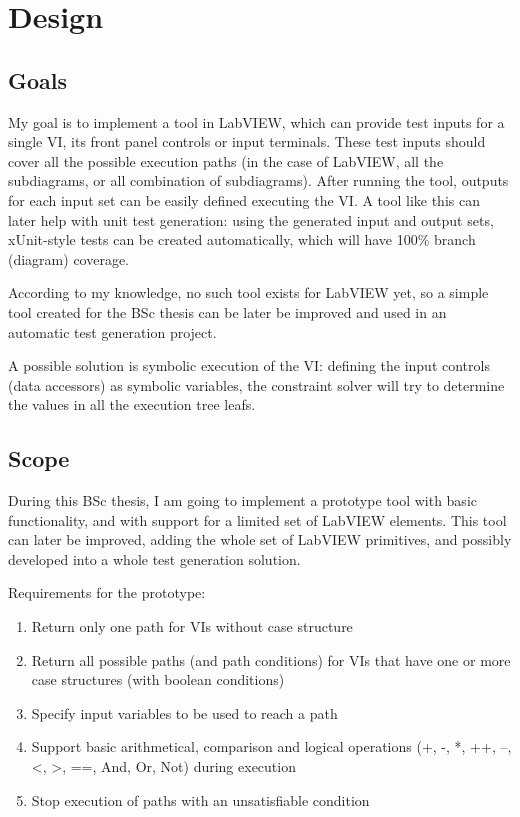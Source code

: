 \chapter{Design}
\section{Goals}
My goal is to implement a tool in LabVIEW, which can provide test inputs for a single VI, its front panel controls or input terminals. These test inputs should cover all the possible execution paths (in the case of LabVIEW, all the subdiagrams, or all combination of subdiagrams). After running the tool, outputs for each input set can be easily defined executing the VI. A tool like this can later help with unit test generation: using the generated input and output sets, xUnit-style tests can be created automatically, which will have 100\% branch (diagram) coverage.

According to my knowledge, no such tool exists for LabVIEW yet, so a simple tool created for the BSc thesis can be later be improved and used in an automatic test generation project.

A possible solution is symbolic execution of the VI: defining the input controls (data accessors) as symbolic variables, the constraint solver will try to determine the values in all the execution tree leafs.
\section{Scope}
During this BSc thesis, I am going to implement a prototype tool with basic functionality, and with support for a limited set of LabVIEW elements. This tool can later be improved, adding the whole set of LabVIEW primitives, and possibly developed into a whole test generation solution. 

Requirements for the prototype:
\begin{enumerate}
\item Return only one path for VIs without case structure
\item Return all possible paths (and path conditions) for VIs that have one or more case structures (with boolean conditions)
\item Specify input variables to be used to reach a path
\item Support basic arithmetical, comparison and logical operations (+, -, *, ++, --, <, >, ==, And, Or, Not) during execution
\item Stop execution of paths with an unsatisfiable condition
\end{enumerate}

